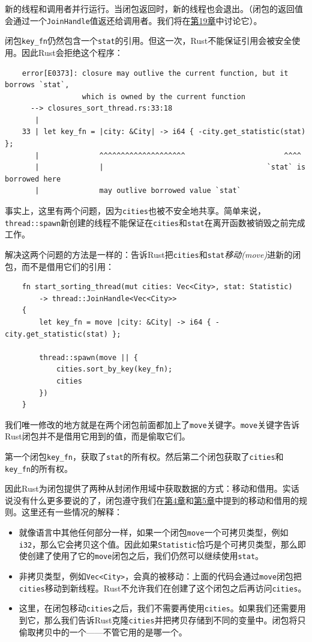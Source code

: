 新的线程和调用者并行运行。当闭包返回时，新的线程也会退出。（闭包的返回值会通过一个\texttt{JoinHandle}值返还给调用者。我们将在\hyperref[ch19]{第19章}中讨论它）。

闭包\texttt{key\_fn}仍然包含一个\texttt{stat}的引用。但这一次，Rust不能保证引用会被安全使用。因此Rust会拒绝这个程序：
\begin{verbatim}
    error[E0373]: closure may outlive the current function, but it borrows `stat`,
                  which is owned by the current function
      --> closures_sort_thread.rs:33:18
       |
    33 | let key_fn = |city: &City| -> i64 { -city.get_statistic(stat) };
       |              ^^^^^^^^^^^^^^^^^^^^                       ^^^^
       |              |                                      `stat` is borrowed here
       |              may outlive borrowed value `stat`
\end{verbatim}

事实上，这里有两个问题，因为\texttt{cities}也被不安全地共享。简单来说，\texttt{thread::spawn}新创建的线程不能保证在\texttt{cities}和\texttt{stat}在离开函数被销毁之前完成工作。

解决这两个问题的方法是一样的：告诉Rust把\texttt{cities}和\texttt{stat}\emph{移动(move)}进新的闭包，而不是借用它们的引用：
\begin{verbatim}
    fn start_sorting_thread(mut cities: Vec<City>, stat: Statistic)
        -> thread::JoinHandle<Vec<City>>
    {
        let key_fn = move |city: &City| -> i64 { -city.get_statistic(stat) };

        thread::spawn(move || {
            cities.sort_by_key(key_fn);
            cities
        })
    }
\end{verbatim}

我们唯一修改的地方就是在两个闭包前面都加上了\texttt{move}关键字。\texttt{move}关键字告诉Rust闭包并不是借用它用到的值，而是偷取它们。

第一个闭包\texttt{key\_fn}，获取了\texttt{stat}的所有权。然后第二个闭包获取了\texttt{cities}和\texttt{key\_fn}的所有权。

因此Rust为闭包提供了两种从封闭作用域中获取数据的方式：移动和借用。实话说没有什么更多要说的了，闭包遵守我们在\hyperref[ch04]{第4章}和\hyperref[ch05]{第5章}中提到的移动和借用的规则。这里还有一些情况的解释：
\begin{itemize}
    \item 就像语言中其他任何部分一样，如果一个闭包\texttt{move}一个可拷贝类型，例如\texttt{i32}，那么它会拷贝这个值。因此如果\texttt{Statistic}恰巧是个可拷贝类型，那么即使创建了使用了它的\texttt{move}闭包之后，我们仍然可以继续使用\texttt{stat}。
    \item 非拷贝类型，例如\texttt{Vec<City>}，会真的被移动：上面的代码会通过\texttt{move}闭包把\texttt{cities}移动到新线程。Rust不允许我们在创建了这个闭包之后再访问\texttt{cities}。
    \item 这里，在闭包移动\texttt{cities}之后，我们不需要再使用\texttt{cities}。如果我们还需要用到它，那么我们告诉Rust克隆\texttt{cities}并把拷贝存储到不同的变量中。闭包将只偷取拷贝中的一个——不管它用的是哪一个。
\end{itemize}

